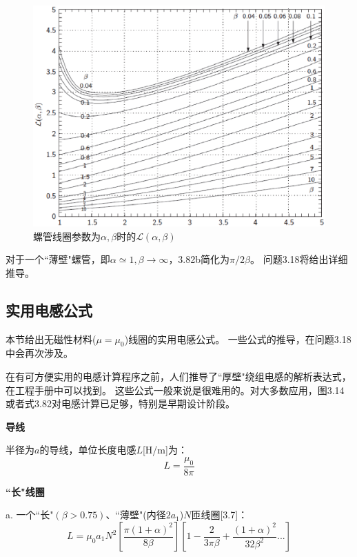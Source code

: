 \begin{figure}[htbp]
  \centering
 \includegraphics[scale=0.7]{chpt3/figs/fig3.14.eps}
  \caption{螺管线圈参数为$\alpha,\beta$时的$\mathcal{L}(\alpha,\beta)$}
\end{figure}

对于一个``薄壁"螺管，即$\alpha\simeq 1,\beta\rightarrow \infty$，3.82b简化为$\pi/2\beta$。
问题3.18将给出详细推导。

\subsection{实用电感公式}
本节给出无磁性材料($\mu=\mu_0$)线圈的实用电感公式。
一些公式的推导，在问题3.18中会再次涉及。

在有可方便实用的电感计算程序之前，人们推导了``厚壁"绕组电感的解析表达式，在工程手册中可以找到。
这些公式一般来说是很难用的。对大多数应用，图3.14或者式3.82对电感计算已足够，特别是早期设计阶段。

\textbf{导线}  
  
半径为$a$的导线，单位长度电感$L$[H/m]为：
  \begin{equation}
         L=\frac{\mu_0}{8\pi}%
  \end{equation}
  
\textbf{``长"线圈} 
  
  a. 一个``长"$(\beta>0.75)$、``薄壁"(内径$2a_1$)$N$匝线圈[3.7]：
\begin{equation}
  L=\mu_0a_1N^2\left[\frac{\pi(1+\alpha)^2}{8\beta}\right]\left[1-\frac{2}{3\pi\beta}+\frac{(1+\alpha)^2}{32\beta^2}...\right]%
\end{equation}

